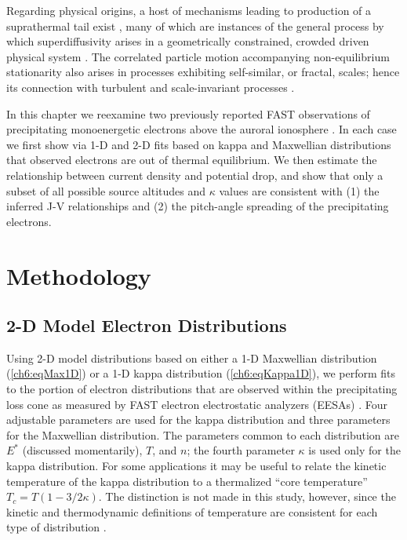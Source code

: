   Regarding physical origins, a host of mechanisms leading to production of a
  suprathermal tail exist \citep[e.g., review by][]{Pierrard2010}, many of which
  are instances of the general process by which superdiffusivity arises in a
  geometrically constrained, crowded driven physical system
  \citep{Benichou2013}.  The correlated particle motion accompanying
  non-equilibrium stationarity also arises in processes exhibiting self-similar,
  or fractal, scales; hence its connection with turbulent and scale-invariant
  processes \citep{West1990,Treumann1999a,Leubner2004}.

  In this chapter we reexamine two previously reported FAST observations of
  precipitating monoenergetic electrons above the auroral ionosphere
  \citep{Elphic1998,Ergun1998a}. In each case we first show via 1-D and 2-D fits
  based on kappa and Maxwellian distributions that observed electrons are out of
  thermal equilibrium. We then estimate the relationship between current density
  and potential drop, and show that only a subset of all possible source
  altitudes and $\kappa$ values are consistent with (1) the inferred J-V
  relationships and (2) the pitch-angle spreading of the precipitating
  electrons.

  \section{Methodology}

  \subsection{2-D Model Electron Distributions} \label{ss2D}

  Using 2-D model distributions based on either a 1-D Maxwellian distribution
  (\ref{ch6:eqMax1D}) or a 1-D kappa distribution (\ref{ch6:eqKappa1D}), we
  perform fits to the portion of electron distributions that are observed within
  the precipitating loss cone as measured by FAST electron electrostatic
  analyzers (EESAs) \citep{Carlson2001}. Four adjustable parameters are used for
  the kappa distribution and three parameters for the Maxwellian
  distribution. The parameters common to each distribution are $E^*$ (discussed
  momentarily), $T$, and $n$; the fourth parameter $\kappa$ is used only for the
  kappa distribution. For some applications \citep[e.g.,][]{Sutherland2012} it
  may be useful to relate the kinetic temperature of the kappa distribution to a
  thermalized ``core temperature'' $T_c = T (1-3/2 \kappa)$. The distinction is
  not made in this study, however, since the kinetic and thermodynamic
  definitions of temperature are consistent for each type of distribution
  \citep{Livadiotis2010}.


